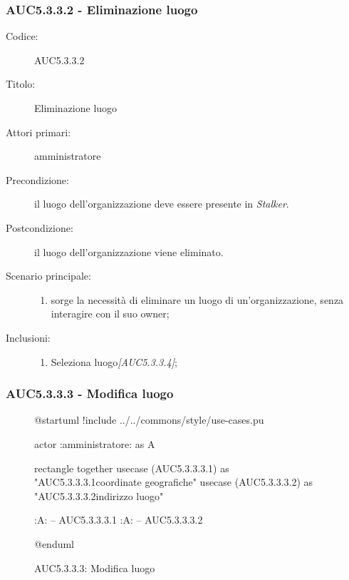 \documentclass[../../../analisi-dei-requisiti.tex]{subfiles}
\begin{document}
\subsubsection{AUC5.3.3.2 - Eliminazione luogo}%
\label{subs:AUC5.3.3.2}
\begin{description}
  \item[Codice:] AUC5.3.3.2
  \item[Titolo:] Eliminazione luogo
  \item[Attori primari:] amministratore
  \item[Precondizione:] il luogo dell'organizzazione deve essere presente in \emph{Stalker}.
  \item[Postcondizione:] il luogo dell'organizzazione viene eliminato.
  \item[Scenario principale:]
  \begin{enumerate}
    \item sorge la necessità di eliminare un luogo di un'organizzazione, senza interagire con il suo owner;
  \end{enumerate}
  \item[Inclusioni:]
  \begin{enumerate}
    \item Seleziona luogo\emph{[AUC5.3.3.4]};
  \end{enumerate}
\end{description}

\subsubsection{AUC5.3.3.3 - Modifica luogo}%
\label{subs:AUC5.3.3.3}

\begin{figure}[H]
  \centering
  \begin{plantuml}
  @startuml
  !include ../../commons/style/use-cases.pu

  actor :amministratore: as A

  rectangle {
    together {
      usecase (AUC5.3.3.3.1) as "AUC5.3.3.3.1\nModifica coordinate geografiche"
      usecase (AUC5.3.3.3.2) as "AUC5.3.3.3.2\nModifica indirizzo luogo"
    }
  }

  :A: -- AUC5.3.3.3.1
  :A: -- AUC5.3.3.3.2

  @enduml
  \end{plantuml}
  \caption{AUC5.3.3.3: Modifica luogo}
  \label{fig:AUC5_3_3_3}
\end{figure}
\end{document}
